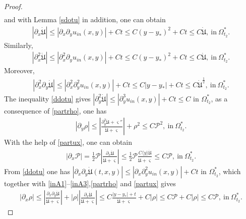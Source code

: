 \documentclass{amsart}
\numberwithin{equation}{section}
\newcommand\y{{{\langle y \rangle}}}
\begin{document}
\begin{proof}
\begin{align}
\end{align}
and with Lemma \ref{sdotu} in addition, one can obtain
\begin{align}\label{partux}
|\partial_{x}\dot{\mathfrak{U}}|
\leq |\partial_{x}\partial_{y}u_{in}(x,y)|+Ct
\leq C(y-y_{*})^{2}+Ct
\leq C\dot{\mathfrak{U}},~\text{in}~\Omega_{t_{2}}^{*}.
\end{align}
Similarly,
\begin{align}\label{partux2}
|\partial_{x}^{2}\dot{\mathfrak{U}}|
\leq |\partial_{x}^{2}\partial_{y}u_{in}(x,y)|+Ct
\leq C(y-y_{*})^{2}+Ct
\leq C\dot{\mathfrak{U}},~\text{in}~\Omega_{t_{2}}^{*}.
\end{align}
Moreover,
\begin{align}\label{partux2y}
|\partial_{x}^{2}\partial_{y}\dot{\mathfrak{U}}|
\leq |\partial_{x}^{2}\partial_{y}^{2}u_{in}(x,y)|+Ct
\leq C|y-y_{*}|+Ct
\leq C\dot{\mathfrak{U}}^{\frac{1}{2}},~\text{in}~\Omega_{t_{2}}^{*}.
\end{align}
The inequality \eqref{ddotu} gives  $|\partial_{y}^{2}\dot{\mathfrak{U}}|\leq|\partial_{y}^{3}u_{in}(x,y)|+Ct\leq C$ in $\Omega_{t_{2}}^{*}$,
as a consequence of \eqref{partrho}, one has
\begin{align}\label{partrhoy}
|\partial_{y}\rho|
\leq \left|\frac{\partial_{y}^{2}\dot{\mathfrak{U}}+\varsigma''}{\dot{\mathfrak{U}}+\varsigma}\right|+\rho^{2}
\leq C\mathcal{P}^{2},~\text{in}~\Omega_{t_{2}}^{*}.
\end{align}
With the help of \eqref{partux}, one can obtain
\begin{align}\label{partpx}
|\partial_{x}\mathcal{P}|
=\frac{1}{2}\mathcal{P}\left|\frac{\partial_{x}\dot{\mathfrak{U}}}{\dot{\mathfrak{U}}+\varsigma}\right|
\leq \frac{1}{2}\mathcal{P}\frac{C\y\dot{\mathfrak{U}}}{\dot{\mathfrak{U}}+\varsigma}
\leq C\mathcal{P},~\text{in}~\Omega_{t_{2}}^{*}.
\end{align}
From \eqref{ddotu} one has $|\partial_{x}\partial_{y}\dot{\mathfrak{U}}(t,x,y)|\leq |\partial_{x}\partial_{y}^{2}u_{in}(x,y)|+Ct$ in $\Omega_{t_{2}}^{*}$, which together with \eqref{inA1}--\eqref{inA3},\eqref{partrho} and \eqref{partux} gives
\begin{align}\label{partrhox}
|\partial_{x}\rho|
\leq \left|\frac{\partial_{x}\partial_{y}\dot{\mathfrak{U}}}{\dot{\mathfrak{U}}+\varsigma}\right|
    +|\rho|\left|\frac{\partial_{x}\dot{\mathfrak{U}}}{\dot{\mathfrak{U}}+\varsigma}\right|
\leq C\frac{|y-y_{*}|+t}{\dot{\mathfrak{U}}+\varsigma}+C|\rho|
\leq C\mathcal{P}+C|\rho|
\leq C\mathcal{P},~\text{in}~\Omega_{t_{2}}^{*}.
\end{align}

\end{proof}
\end{document}
